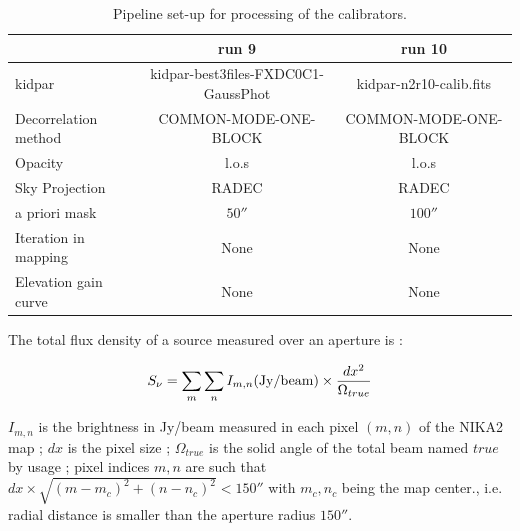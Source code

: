 \begin{table}[h]
\begin{center}
\begin{tabular}{|l|c|c|}
\hline
                      &    run 9                             &  run  10                   \\
\hline
kidpar                &  {\scriptsize kidpar-best3files-FXDC0C1-GaussPhot} &  {\scriptsize kidpar-n2r10-calib.fits}   \\
Decorrelation method  &  {\scriptsize COMMON-MODE-ONE-BLOCK} &    {\scriptsize COMMON-MODE-ONE-BLOCK}    \\
Opacity               &  {\scriptsize  l.o.s}                &  {\scriptsize l.o.s}     \\
Sky Projection        &  {\scriptsize RADEC}                  &  {\scriptsize RADEC}     \\
a priori mask         &  {\scriptsize   $50''$}              &  {\scriptsize $100''$}  \\
Iteration in mapping  &  {\scriptsize  None}                 &  {\scriptsize None}     \\
Elevation gain curve  &  {\scriptsize  None}                 &  {\scriptsize None}      \\
\hline
\end{tabular}
\caption[Data reduction parameters]{Pipeline set-up for processing of the calibrators.}
\label{tab:Pipe}
\end{center}
\end{table}

The total flux density of a source  measured over an aperture  is :

\begin{equation}
S_{\nu} = \sum_{m} \sum_{n}  I_{m,n} ({\rm Jy/beam}) \times {dx^2 \over {\Omega_{true}}}
\label{eq:ApPh}
\end{equation}


\noindent  $I_{m,n}$ is the brightness in Jy/beam measured in each
pixel $(m,n)$ of the NIKA2 map ; $dx$ is the pixel size ;
$\Omega_{true}$ is the solid angle of the total beam named $true$ by usage ; pixel
indices $m,n$ are such that $dx \times \sqrt{(m-m_c)^2 + (n-n_c)^2} < 150''$ with 
$m_c,n_c$ being the map center., i.e. radial distance is smaller than the aperture radius $150''$.

